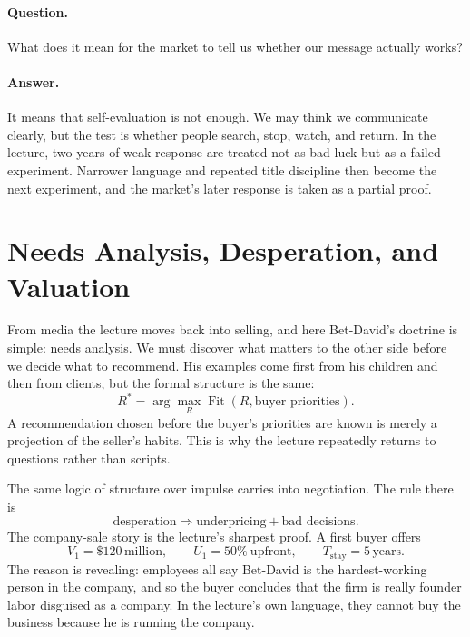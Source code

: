 \paragraph{Question.} What does it mean for the market to tell us whether our message actually works?

\paragraph{Answer.} It means that self-evaluation is not enough. We may think we communicate clearly, but the test is whether people search, stop, watch, and return. In the lecture, two years of weak response are treated not as bad luck but as a failed experiment. Narrower language and repeated title discipline then become the next experiment, and the market's later response is taken as a partial proof.

\section{Needs Analysis, Desperation, and Valuation}

From media the lecture moves back into selling, and here Bet-David's doctrine is simple: needs analysis. We must discover what matters to the other side before we decide what to recommend. His examples come first from his children and then from clients, but the formal structure is the same:
\begin{equation}
R^*=\arg\max_R \operatorname{Fit}(R,\text{buyer priorities}).
\end{equation}
A recommendation chosen before the buyer's priorities are known is merely a projection of the seller's habits. This is why the lecture repeatedly returns to questions rather than scripts.

The same logic of structure over impulse carries into negotiation. The rule there is
\begin{equation}
\text{desperation}\Rightarrow \text{underpricing}+\text{bad decisions}.
\end{equation}
The company-sale story is the lecture's sharpest proof. A first buyer offers
\begin{equation}
V_1=\$120\,\text{million},\qquad
U_1=50\%\ \text{upfront},\qquad
T_{\text{stay}}=5\,\text{years}.
\end{equation}
The reason is revealing: employees all say Bet-David is the hardest-working person in the company, and so the buyer concludes that the firm is really founder labor disguised as a company. In the lecture's own language, they cannot buy the business because he is running the company.


